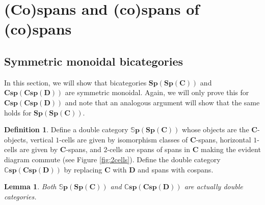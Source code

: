 \documentclass[11pt]{amsart}
\newcommand{\cat}[1]{\mathbf{#1}}
\newcommand{\bispsp}[1]{\mathbf{Sp(Sp(#1))}}
\newcommand{\dblspsp}[1]{\mathbb{S}\mathbf{p(Sp(#1))}}
\newcommand{\bicspcsp}[1]{\mathbf{Csp(Csp(#1))}}
\newcommand{\dblcspcsp}[1]{\mathbb{C}\mathbf{sp(Csp(#1))}}
\newtheorem{lem}[thm]{Lemma}
\theoremstyle{remark}
\theoremstyle{definition}
\newtheorem{defn}[thm]{Definition}
\begin{document}


\section{(Co)spans and (co)spans of (co)spans}                  
\label{sec:SpansSpans}

\subsection{Symmetric monoidal bicategories} %
\label{subsec.SpansSpanssAreSMBicat}

In this section, we will show that bicategories $\bispsp{C}$ and $\bicspcsp{D}$ are symmetric monoidal. Again, we will only prove this for $\bicspcsp{D}$ and note that an analogous argument will show that the same holds for $\bispsp{C}$.  

\begin{defn}
\label{def:DblCatSpanSpan}
	Define a double category $\dblspsp{C}$ whose objects are the $\cat{C}$-objects, vertical $1$-cells are given by isomorphism classes of $\cat{C}$-spans, horizontal $1$-cells are given by $\cat{C}$-spans, and $2$-cells are spans of spans in $\cat{C}$ making the evident diagram commute (see Figure \ref{fig:2cells}). Define the double category $\dblcspcsp{D}$ by replacing $\cat{C}$ with $\cat{D}$ and spans with cospans.  
\end{defn}

\begin{lem}
	\label{lem:SpanSpanDoubleCat}
	Both $\dblspsp{C}$ and $\dblcspcsp{D}$ are actually double categories.  
\end{lem}
\end{document}
